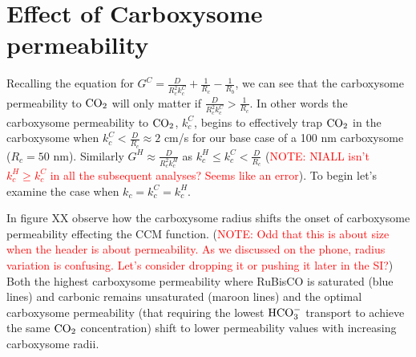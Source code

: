 \documentclass[]{article}
\begin{document}
\section{Effect of Carboxysome permeability}


Recalling the equation for $G^C = \frac{D}{R_c^2 k_c^C} + \frac{1}{R_c}-\frac{1}{R_b}$, we can see that the carboxysome permeability to  ${\rm CO_2}$ will only matter if $ \frac{D}{R_c^2 k_c^C} >\frac{1}{R_c}$. In other words the carboxysome permeability to ${\rm CO_2}$, $k_c^C$, begins to effectively trap ${\rm CO_2}$ in the carboxysome when $k_c^C < \frac{D}{R_c} \approx 2$ cm/s for our base case of a 100 nm carboxysome ($R_c = 50$ nm). Similarly $G^H \approx \frac{D}{R_c^2 k_c^H}$ as $k_c^H \leq k_c^C < \frac{D}{R_c}$ (\textcolor{red}{NOTE: NIALL isn't $k_c^H \geq k_c^C$ in all the subsequent analyses? Seems like an error}). To begin let's examine the case when $k_c = k_c^C = k_c^H$.

In figure XX observe how the carboxysome radius shifts the onset of carboxysome permeability effecting the CCM function. (\textcolor{red}{NOTE: Odd that this is about size when the header is about permeability. As we discussed on the phone, radius variation is confusing. Let's consider dropping it or pushing it later in the SI?}) Both the highest carboxysome permeability where RuBisCO is saturated (blue lines) and carbonic remains unsaturated (maroon lines) and the optimal carboxysome permeability (that requiring the lowest ${\rm HCO_3^-}$ transport to achieve the same ${\rm CO_2}$ concentration) shift to lower permeability values with increasing carboxysome radii.
\end{document}

